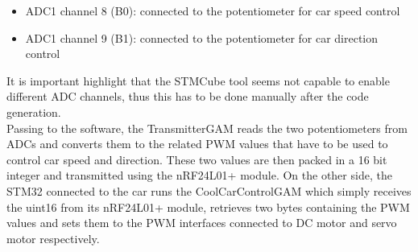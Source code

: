 \begin{itemize}
\item ADC1 channel 8 (B0): connected to the potentiometer for car speed control
\item ADC1 channel 9 (B1): connected to the potentiometer for car direction control
\end{itemize}
It is important highlight that the STMCube tool seems not capable to enable different ADC channels, thus this has to be done manually after the code generation.\\
Passing to the software, the TransmitterGAM reads the two potentiometers from ADCs and converts them to the related PWM values that have to be used to control car speed and direction. These two values are then packed in a 16 bit integer and transmitted using the nRF24L01+ module. On the other side, the STM32 connected to the car runs the CoolCarControlGAM which simply receives the uint16 from its nRF24L01+ module, retrieves two bytes containing the PWM values and sets them to the PWM interfaces connected to DC motor and servo motor respectively.

